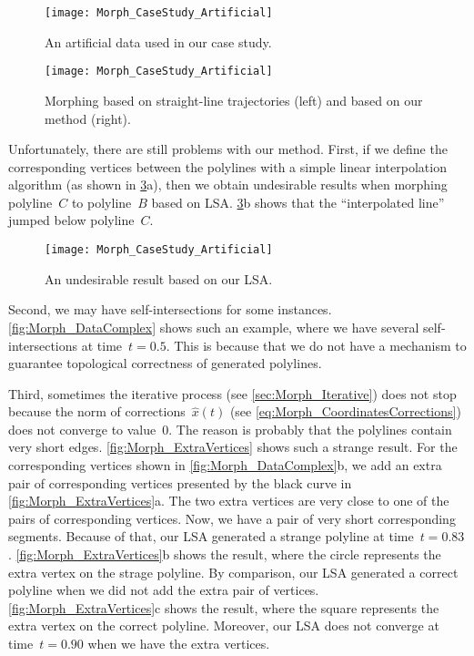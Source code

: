 \begin{figure}[tb]
	\centering	
	\texttt{[image: Morph\_CaseStudy\_Artificial]}
	\caption{An artificial data used in our case study.}
	\label{fig:Morph_Data}
\end{figure}


\begin{figure}[tb]
	\centering	
	\texttt{[image: Morph\_CaseStudy\_Artificial]}
	\caption{Morphing based on 
		straight-line trajectories (left) and
		based on our method (right).}
	\label{fig:Morph_Comparison}
\end{figure}

Unfortunately, there are still problems with our method. 
First, if we define the corresponding vertices 
between the polylines 
with a simple linear interpolation algorithm
(as shown in \fig\ref{fig:Morph_Undesirable}a), 
then we obtain undesirable results 
when morphing polyline~$C$ to polyline~$B$ 
based on LSA.
\fig\ref{fig:Morph_Undesirable}b shows that 
the ``interpolated line'' jumped below polyline~$C$.

\begin{figure}[tb]
	\centering	
	\texttt{[image: Morph\_CaseStudy\_Artificial]}
	\caption{An undesirable result based on our LSA.}
	\label{fig:Morph_Undesirable}
\end{figure}

Second, we may have self-intersections for some instances.
\fig\ref{fig:Morph_DataComplex} shows such an example,
where we have several self-intersections at time~$t=0.5$.
This is because that 
we do not have a mechanism to guarantee topological correctness
of generated polylines.

Third, sometimes the iterative process
(see \sect\ref{sec:Morph_Iterative})
does not stop because the norm of corrections~$\hat{x}(t)$
(see \eq\ref{eq:Morph_CoordinatesCorrections})
does not converge to value~$0$.
The reason is probably that
the polylines contain very short edges. 
\fig\ref{fig:Morph_ExtraVertices} shows such a strange result. 
For the corresponding vertices shown in 
\fig\ref{fig:Morph_DataComplex}b, 
we add an extra pair of corresponding vertices 
presented by the black curve in 
\fig\ref{fig:Morph_ExtraVertices}a.
The two extra vertices are very close to 
one of the pairs of corresponding vertices. 
Now, we have a pair of very short corresponding segments.
Because of that, our LSA generated a strange polyline 
at time~$t = 0.83$.
\fig\ref{fig:Morph_ExtraVertices}b shows the result, 
where the circle represents the extra vertex 
on the strage polyline.
By comparison, our LSA generated a correct polyline 
when we did not add the extra pair of vertices.
\fig\ref{fig:Morph_ExtraVertices}c shows the result, 
where the square represents the extra vertex 
on the correct polyline.
Moreover, our LSA does not converge 
at time~$t = 0.90$ when we have the extra vertices.

